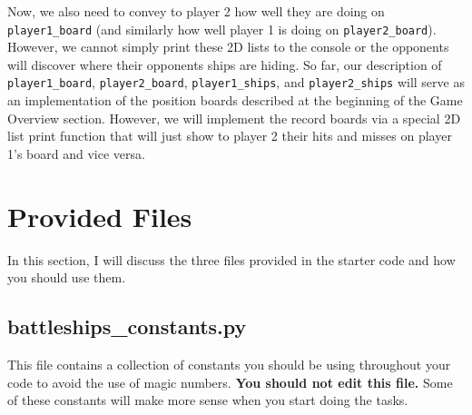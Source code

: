 \documentclass{article}
\begin{document}
Now, we also need to convey to player 2 how well they are doing on \texttt{player1\_board} (and similarly how well player 1 is doing on \texttt{player2\_board}). However, we cannot simply print these 2D lists to the console or the opponents will discover where their opponents ships are hiding. So far, our description of \texttt{player1\_board}, \texttt{player2\_board}, \texttt{player1\_ships}, and \texttt{player2\_ships} will serve as an implementation of the position boards described at the beginning of the Game Overview section. However, we will implement the record boards via a special 2D list print function that will just show to player 2 their hits and misses on player 1's board and vice versa. 

\section*{Provided Files}
In this section, I will discuss the three files provided in the starter code and how you should use them.

\subsection*{battleships\_constants.py}
This file contains a collection of constants you should be using throughout your code to avoid the use of magic numbers. \textbf{You should not edit this file.} Some of these constants will make more sense when you start doing the tasks.
\end{document}

